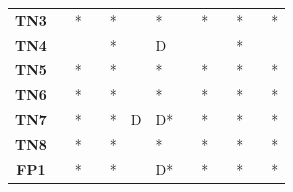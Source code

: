 \begin{table}
\begin{tabularx}{\textwidth}{ c YYYYYYYYYYYY}
        \textbf{TN3}  &                                  & *                                    &                                        & *                                        &                                       & *                                      &             & *          &             & *          &             & *          \\
        \textbf{TN4}  &                                  &                                      &                                        & *                                        &                                       & D                                      &             &            &             & *          &             &            \\
        \textbf{TN5}  &                                  & *                                    &                                        & *                                        &                                       & *                                      &             & *          &             & *          &             & *          \\
        \textbf{TN6}  &                                  & *                                    &                                        & *                                        &                                       & *                                      &             & *          &             & *          &             & *          \\
        \textbf{TN7}  &                                  & *                                    &                                        & *                                        & D                                     & D*                                     &             & *          &             & *          &             & *          \\
        \textbf{TN8}  &                                  & *                                    &                                        & *                                        &                                       & *                                      &             & *          &             & *          &             & *          \\
        \midrule
        \textbf{FP1}  &                                  & *                                    &                                        & *                                        &                                       & D*                                     &             & *          &             & *          &             & *          \\

\end{tabularx}
\end{table}

